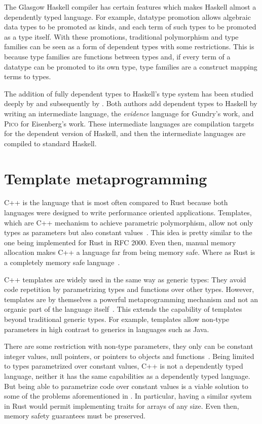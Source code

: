 The Glasgow Haskell compiler has certain features which makes Haskell almost a
dependently typed language. For example, datatype promotion allows algebraic
data types to be promoted as kinds, and each term of such types to be promoted
as a type itself. With these promotions, traditional polymorphism and type
families can be seen as a form of dependent types with some restrictions. This
is because type families are functions between types and, if every term of a
datatype can be promoted to its own type, type families are a construct mapping
terms to types.

The addition of fully dependent types to Haskell's type system has been studied
deeply by \citet{gundry} and subsequently by \citet{eisenberg}. Both authors
add dependent types to Haskell by writing an intermediate language, the
\textit{evidence} language for Gundry's work, and \textsc{Pico} for Eisenberg's
work.  These intermediate languages are compilation targets for the dependent
version of Haskell, and then the intermediate languages are compiled to
standard Haskell. 


\section{Template metaprogramming}

C++ is the language that is most often compared to Rust because both languages
were designed to write performance oriented applications. Templates, which are
C++ mechanism to achieve parametric polymorphism, allow not only types as
parameters but also constant values~\cite{templates}. This idea is pretty
similar to the one being implemented for Rust in RFC 2000. Even then, manual
memory allocation makes C++ a language far from being memory safe. Where as
Rust is a completely memory safe language~\cite{ralf}.    

C++ templates are widely used in the same way as generic types: They avoid code
repetition by parametrizing types and functions over other types. However,
templates are by themselves a powerful metaprogramming mechanism and not an
organic part of the language itself~\cite{template_metaprogramming}. This
extends the capability of templates beyond traditional generic types. For
example, templates allow non-type parameters in high contrast to generics in
languages such as Java.

There are some restriction with non-type parameters, they only can be constant
integer values, null pointers, or pointers to objects and
functions~\cite{templates}. Being limited to types parametrized over constant
values, C++ is not a dependently typed language, neither it has the same
capabilities as a dependently typed language. But being able to parametrize
code over constant values is a viable solution to some of the problems
aforementioned in . In particular, having a similar
system in Rust would permit implementing traits for arrays of any size. Even
then, memory safety guarantees must be preserved.

